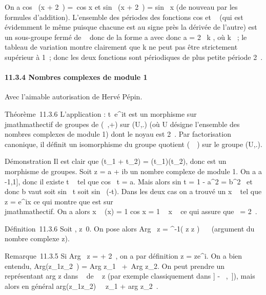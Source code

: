 \documentclass[]{article}
\begin{document}
On a cos~ (x + 2\pi~) =\
cos x et sin~ (x + 2\pi~)
= sin~ x (de nouveau par les formules
d'addition). L'ensemble des périodes des fonctions
cos et \sin~ (qui est
évidemment le même puisque chacune est au signe près la dérivée de
l'autre) est un sous-groupe fermé de \mathbb{R}~ donc de la forme a avec donc a
= 2\pi~ \over k , où k \in \mathbb{Z}~; le tableau de variation
montre clairement que k ne peut pas être strictement supérieur à 1~;
donc les deux fonctions sont périodiques de plus petite période 2\pi~.

\paragraph{11.3.4 Nombres complexes de module 1}

Avec l'aimable autorisation de Hervé Pépin.

Théorème~11.3.6 L'application \phi :
t\mapsto~e^it est un morphisme sur\\jmathmathectif
de groupes de (~,+) sur (U,.) (où U désigne l'ensemble des nombres
complexes de module 1) dont le noyau est 2\pi~\mathbb{Z}. Par factorisation
canonique, il définit un isomorphisme \overline\phi du
groupe quotient (~\pi~) sur le groupe (U,.).

Démonstration Il est clair que \phi(t_1 + t_2) =
\phi(t_1)\phi(t_2), donc \phi est un morphisme de groupes. Soit
z = a + ib un nombre complexe de module 1. On a a \in {[}-1,1{]}, donc il
existe t \in \mathbb{R}~ tel que cos~ t = a. Mais alors
sin t = 1 - a^2 = b^2~ et
donc b vaut soit sin~ t soit
sin~ (-t). Dans les deux cas on a trouvé un x \in
{}~ tel que z = e^ix ce qui montre que \phi est sur\\jmathmathectif. On a
alors x \in\mathrmKer~\phi
\Leftrightarrow \phi(x) = 1 \mathrel\Leftrightarrow
cos x = 1 \mathrel\Leftrightarrow~ x \pi~
ce qui assure que
\mathrmKer~\phi = 2\pi~.

Définition~11.3.6 Soit \zeta \in {}, z\neq~0. On pose
alors Arg~ z =
\overline\phi^-1( z \over
z ) \in {}~\pi~ (argument du nombre complexe z).

Remarque~11.3.5 Si Arg~ z = \theta + 2\pi~, on a par
définition z = ze^i\theta. On a bien entendu,
Arg(z_1z_2~)
= Arg z_1~ +\
Arg z_2. On peut prendre un représentant
arg z dans ~ de \Arg~
z (par exemple classiquement dans {]} - \pi~,\pi~{]}), mais alors en général
arg(z_1z_2)\neq~\arg~
z_1 + arg z_2~.
\end{document}
